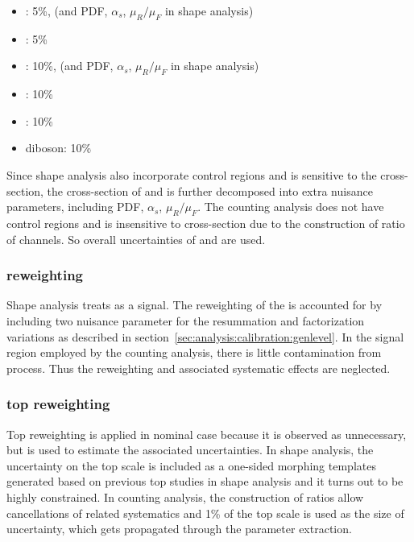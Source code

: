 \begin{itemize}
    \item \ttbar: 5\%, (and PDF, $\alpha_{s}$, $\mu_{R}/\mu_{F}$ in shape analysis)
    \item \tW:    5\%
    \item \zjets: 10\%, (and PDF, $\alpha_{s}$, $\mu_{R}/\mu_{F}$ in shape analysis)
    \item \wjets: 10\%
    \item \gjets: 10\%
    \item diboson: 10\%
\end{itemize}
Since shape analysis also incorporate \zjets control regions and is sensitive to the \ttbar cross-section, the cross-section of \zjets and \ttbar is further decomposed into extra nuisance parameters, including PDF, $\alpha_{s}$, $\mu_{R}/\mu_{F}$. The counting analysis does not have \zjets control regions and is insensitive to \ttbar cross-section due to the construction of ratio of channels. So overall uncertainties of \ttbar and \zjets are used.

\subsubsection{\WW \pt reweighting}
Shape analysis treats \WW as a signal. The reweighting of the \WW \pt is accounted for by including two nuisance parameter for the resummation and factorization variations as described in section~\ref{sec:analysis:calibration:genlevel}. In the \ttbar signal region employed by the counting analysis, there is little contamination from \WW process. Thus the \WW \pt reweighting and associated systematic effects are neglected.

\subsubsection{top \pt reweighting}
Top \pt reweighting is applied in nominal case because it is observed as unnecessary, but is used to estimate the associated uncertainties. In shape analysis, the uncertainty on the top \pt scale is included as a one-sided morphing templates generated based on previous top studies in shape analysis and it turns out to be highly constrained. In counting analysis, the construction of ratios allow cancellations of \ttbar related systematics and 1\% of the top \pt scale is used as the size of uncertainty, which gets propagated through the parameter extraction.


